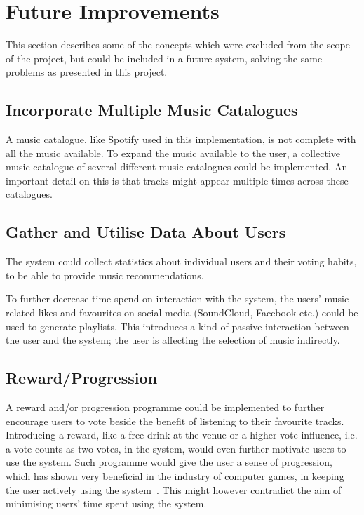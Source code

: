 \chapter{Future Improvements}
\label{future}

This section describes some of the concepts which were excluded from the scope of the project, but could be included in a future system, solving the same problems as presented in this project.

\section{Incorporate Multiple Music Catalogues}
A music catalogue, like Spotify used in this implementation, is not complete with all the music available. To expand the music available to the user, a collective music catalogue of several different music catalogues could be implemented. An important detail on this is that tracks might appear multiple times across these catalogues.

\section{Gather and Utilise Data About Users}
The system could collect statistics about individual users and their voting habits, to be able to provide music recommendations.

To further decrease time spend on interaction with the system, the
users' music related likes and favourites on social media (SoundCloud,
Facebook etc.) could be used to generate playlists. This introduces a
kind of passive interaction between the user and the system; the user
is affecting the selection of music indirectly.

\section{Reward/Progression}
A reward and/or progression programme could be implemented to further encourage users to vote beside the benefit of listening to their favourite tracks. Introducing a reward, like a free drink at the venue or a higher vote influence, i.e. a vote counts as two votes, in the system, would even further motivate users to use the system. Such programme would give the user a sense of progression, which has shown very beneficial in the industry of computer games, in keeping the user actively using the system~\cite{games}. This might however contradict the aim of minimising users' time spent using the system.

